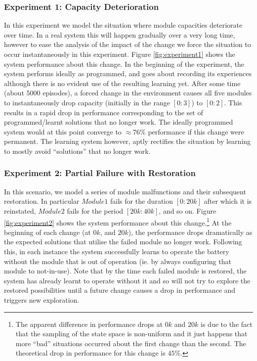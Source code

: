 

 

\subsubsection{Experiment 1: Capacity Deterioration}

In this experiment we model the situation where module capacities deteriorate over time. In a real system this will happen gradually over a very long time, however to ease the analysis of the impact of the change we force the situation to occur instantaneously in this experiment. Figure \ref{fig:experiment1} shows the system performance about this change. In the beginning of the experiment, the system performs ideally as programmed, and goes about recording its experiences although there is no evident use of the resulting learning yet. After some time (about $5000$ episodes), a forced change in the environment causes all five modules to instantaneously drop capacity (initially in the range $[0:3]$) to $[0:2]$. This results in a rapid drop in performance corresponding to the set of programmed/learnt solutions that no longer work. The ideally programmed system would at this point converge to $\approx 76\%$ performance if this change were permanent. The learning system however, aptly rectifies the situation by learning to mostly avoid ``solutions'' that no longer work. 


%

\subsubsection{Experiment 2: Partial Failure with Restoration}

In this scenario, we model a series of module malfunctions and their subsequent restoration. In particular $Module1$ fails for the duration $[0:20k]$ after which it is reinstated, $Module2$ fails for the period $[20k:40k]$, and so on. Figure \ref{fig:experiment2} shows the system performance about this change.\footnote{The apparent difference in performance drops at $0k$ and $20k$ is due to the fact that the sampling of the state space is non-uniform and it just happens that more ``bad'' situations occurred about the first change than the second. The theoretical drop in performance for this change is $45\%$.} At the beginning of each change (at $0k$, and $20k$), the performance drops dramatically as the expected solutions that utilise the failed module no longer work. Following this, in each instance the system successfully learns to operate the battery without the module that is out of operation (ie. by always configuring that module to not-in-use). Note that by the time each failed module is restored, the system has already learnt to operate without it and so will not try to explore the restored possibilities until a future change causes a drop in performance and triggers new exploration.


